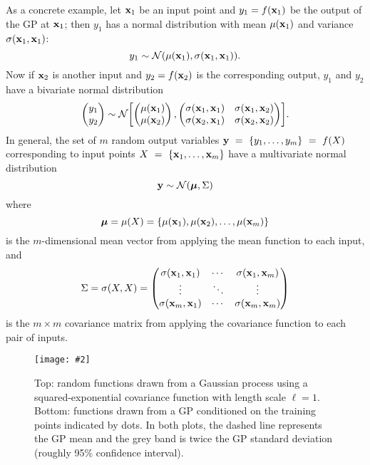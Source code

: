 \documentclass[aps,prc,reprint,superscriptaddress,amsmath]{revtex4-1}
\newcommand{\colfig}[3][t]{
  \begin{figure}[#1]
    \texttt{[image: \#2]}
    \caption{\label{fig:#2}#3}
  \end{figure}
}
\begin{document}
As a concrete example, let $\mathbf x_1$ be an input point and $y_1 = f(\mathbf x_1)$ be the output of the GP at $\mathbf x_1$; then $y_1$ has a normal distribution with mean $\mu(\mathbf x_1)$ and variance $\sigma(\mathbf x_1, \mathbf x_1)$:
\begin{equation}
  y_1 \sim \mathcal N(\mu(\mathbf x_1), \sigma(\mathbf x_1, \mathbf x_1)).
\end{equation}
Now if $\mathbf x_2$ is another input and $y_2 = f(\mathbf x_2)$ is the corresponding output, $y_1$ and $y_2$ have a bivariate normal distribution
\begin{equation}
  \begin{pmatrix}
    y_1 \\ y_2
  \end{pmatrix}
  \sim \mathcal N\biggl[
    \begin{pmatrix}
      \mu(\mathbf x_1) \\ \mu(\mathbf x_2)
    \end{pmatrix},
    \begin{pmatrix}
      \sigma(\mathbf x_1, \mathbf x_1) & \sigma(\mathbf x_1, \mathbf x_2) \\
      \sigma(\mathbf x_2, \mathbf x_1) & \sigma(\mathbf x_2, \mathbf x_2) \\
    \end{pmatrix}
  \biggr].
\end{equation}
In general, the set of $m$ random output variables $\mathbf y~=~\{y_1, \ldots, y_m\}~=~f(X)$ corresponding to input points $X~=~\{\mathbf x_1, \ldots, \mathbf x_m\}$ have a multivariate normal distribution
\begin{equation}
  \mathbf y \sim \mathcal N(\boldsymbol\mu, \Sigma)
\end{equation}
where
\begin{equation}
  \boldsymbol\mu = \mu(X) = \{\mu(\mathbf x_1), \mu(\mathbf x_2), \ldots, \mu(\mathbf x_m)\} \\
\end{equation}
is the $m$-dimensional mean vector from applying the mean function to each input, and
\begin{equation}
  \Sigma = \sigma(X, X) =
  \begin{pmatrix}
    \sigma(\mathbf x_1, \mathbf x_1) & \cdots & \sigma(\mathbf x_1, \mathbf x_m) \\
    \vdots & \ddots & \vdots \\
    \sigma(\mathbf x_m, \mathbf x_1) & \cdots & \sigma(\mathbf x_m, \mathbf x_m) \\
  \end{pmatrix}
\end{equation}
is the $m \times m$ covariance matrix from applying the covariance function to each pair of inputs.

\colfig{gp}{
  Top: random functions drawn from a Gaussian process using a squared-exponential covariance function with length scale $\ell = 1$.
  Bottom: functions drawn from a GP conditioned on the training points indicated by dots.
  In both plots, the dashed line represents the GP mean and the grey band is twice the GP standard deviation (roughly 95\% confidence interval).
}
\end{document}
